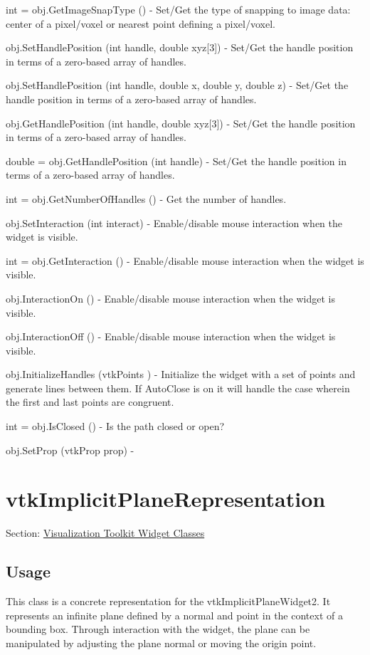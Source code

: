 \begin{DoxyItemize}
\item {\ttfamily int = obj.\-Get\-Image\-Snap\-Type ()} -\/ Set/\-Get the type of snapping to image data\-: center of a pixel/voxel or nearest point defining a pixel/voxel.  
\item {\ttfamily obj.\-Set\-Handle\-Position (int handle, double xyz\mbox{[}3\mbox{]})} -\/ Set/\-Get the handle position in terms of a zero-\/based array of handles.  
\item {\ttfamily obj.\-Set\-Handle\-Position (int handle, double x, double y, double z)} -\/ Set/\-Get the handle position in terms of a zero-\/based array of handles.  
\item {\ttfamily obj.\-Get\-Handle\-Position (int handle, double xyz\mbox{[}3\mbox{]})} -\/ Set/\-Get the handle position in terms of a zero-\/based array of handles.  
\item {\ttfamily double = obj.\-Get\-Handle\-Position (int handle)} -\/ Set/\-Get the handle position in terms of a zero-\/based array of handles.  
\item {\ttfamily int = obj.\-Get\-Number\-Of\-Handles ()} -\/ Get the number of handles.  
\item {\ttfamily obj.\-Set\-Interaction (int interact)} -\/ Enable/disable mouse interaction when the widget is visible.  
\item {\ttfamily int = obj.\-Get\-Interaction ()} -\/ Enable/disable mouse interaction when the widget is visible.  
\item {\ttfamily obj.\-Interaction\-On ()} -\/ Enable/disable mouse interaction when the widget is visible.  
\item {\ttfamily obj.\-Interaction\-Off ()} -\/ Enable/disable mouse interaction when the widget is visible.  
\item {\ttfamily obj.\-Initialize\-Handles (vtk\-Points )} -\/ Initialize the widget with a set of points and generate lines between them. If Auto\-Close is on it will handle the case wherein the first and last points are congruent.  
\item {\ttfamily int = obj.\-Is\-Closed ()} -\/ Is the path closed or open?  
\item {\ttfamily obj.\-Set\-Prop (vtk\-Prop prop)} -\/  
\end{DoxyItemize}\hypertarget{vtkwidgets_vtkimplicitplanerepresentation}{}\section{vtk\-Implicit\-Plane\-Representation}\label{vtkwidgets_vtkimplicitplanerepresentation}
Section\-: \hyperlink{sec_vtkwidgets}{Visualization Toolkit Widget Classes} \hypertarget{vtkwidgets_vtkxyplotwidget_Usage}{}\subsection{Usage}\label{vtkwidgets_vtkxyplotwidget_Usage}
This class is a concrete representation for the vtk\-Implicit\-Plane\-Widget2. It represents an infinite plane defined by a normal and point in the context of a bounding box. Through interaction with the widget, the plane can be manipulated by adjusting the plane normal or moving the origin point.

